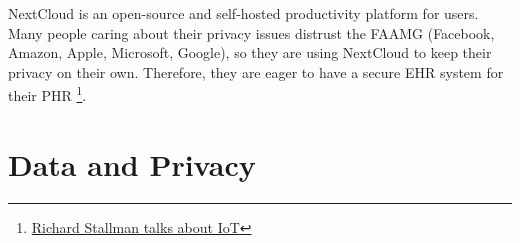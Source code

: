 NextCloud is an open-source and self-hosted productivity platform for users.
Many people caring about their privacy issues distrust the FAAMG (Facebook,
Amazon, Apple, Microsoft, Google), so they are using NextCloud to keep their privacy
on their own. Therefore, they are eager to have a secure EHR system for their
PHR
\footnote{\href{https://www.youtube.com/watch?v=AAP4N3KyLmM}{Richard Stallman talks about IoT}}.

\section{Data and Privacy}
